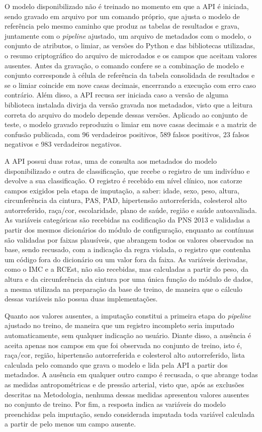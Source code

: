 O modelo disponibilizado não é treinado no momento em que a API é iniciada, sendo gravado em arquivo por um comando próprio, que ajusta o modelo de referência pelo mesmo caminho que produz as tabelas de resultados e grava, juntamente com o \textit{pipeline} ajustado, um arquivo de metadados com o modelo, o conjunto de atributos, o limiar, as versões do Python e das bibliotecas utilizadas, o resumo criptográfico do arquivo de microdados e os campos que aceitam valores ausentes. Antes da gravação, o comando confere se a combinação de modelo e conjunto corresponde à célula de referência da tabela consolidada de resultados e se o limiar coincide em nove casas decimais, encerrando a execução com erro caso contrário. Além disso, a API recusa ser iniciada caso a versão de alguma biblioteca instalada divirja da versão gravada nos metadados, visto que a leitura correta do arquivo do modelo depende dessas versões. Aplicado ao conjunto de teste, o modelo gravado reproduziu o limiar em nove casas decimais e a matriz de confusão publicada, com 96 verdadeiros positivos, 589 falsos positivos, 23 falsos negativos e 983 verdadeiros negativos.

A API possui duas rotas, uma de consulta aos metadados do modelo disponibilizado e outra de classificação, que recebe o registro de um indivíduo e devolve a sua classificação. O registro é recebido em nível clínico, nos catorze campos exigidos pela etapa de imputação, a saber: idade, sexo, peso, altura, circunferência da cintura, PAS, PAD, hipertensão autorreferida, colesterol alto autorreferido, raça/cor, escolaridade, plano de saúde, região e saúde autoavaliada. As variáveis categóricas são recebidas na codificação da PNS 2013 e validadas a partir dos mesmos dicionários do módulo de configuração, enquanto as contínuas são validadas por faixas plausíveis, que abrangem todos os valores observados na base, sendo recusado, com a indicação da regra violada, o registro que contenha um código fora do dicionário ou um valor fora da faixa. As variáveis derivadas, como o IMC e a RCEst, não são recebidas, mas calculadas a partir do peso, da altura e da circunferência da cintura por uma única função do módulo de dados, a mesma utilizada na preparação da base de treino, de maneira que o cálculo dessas variáveis não possua duas implementações.

Quanto aos valores ausentes, a imputação constitui a primeira etapa do \textit{pipeline} ajustado no treino, de maneira que um registro incompleto seria imputado automaticamente, sem qualquer indicação ao usuário. Diante disso, a ausência é aceita apenas nos campos em que foi observada no conjunto de treino, isto é, raça/cor, região, hipertensão autorreferida e colesterol alto autorreferido, lista calculada pelo comando que grava o modelo e lida pela API a partir dos metadados. A ausência em qualquer outro campo é recusada, o que abrange todas as medidas antropométricas e de pressão arterial, visto que, após as exclusões descritas na Metodologia, nenhuma dessas medidas apresentou valores ausentes no conjunto de treino. Por fim, a resposta indica as variáveis do modelo preenchidas pela imputação, sendo considerada imputada toda variável calculada a partir de pelo menos um campo ausente.

